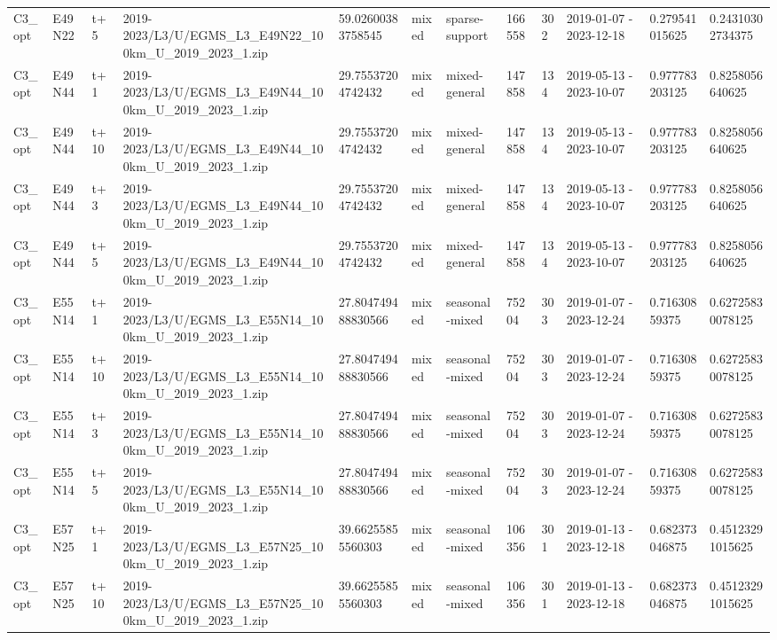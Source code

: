 \begin{landscape}
\begin{longtable}{llllllllllll}
C3\_opt & E49N22 & t+5 & 2019-2023/L3/U/EGMS\_L3\_E49N22\_100km\_U\_2019\_2023\_1.zip & 59.02600383758545 & mixed & sparse-support & 166558 & 302 & 2019-01-07 - 2023-12-18 & 0.279541015625 & 0.24310302734375 \\
C3\_opt & E49N44 & t+1 & 2019-2023/L3/U/EGMS\_L3\_E49N44\_100km\_U\_2019\_2023\_1.zip & 29.75537204742432 & mixed & mixed-general & 147858 & 134 & 2019-05-13 - 2023-10-07 & 0.977783203125 & 0.8258056640625 \\
C3\_opt & E49N44 & t+10 & 2019-2023/L3/U/EGMS\_L3\_E49N44\_100km\_U\_2019\_2023\_1.zip & 29.75537204742432 & mixed & mixed-general & 147858 & 134 & 2019-05-13 - 2023-10-07 & 0.977783203125 & 0.8258056640625 \\
C3\_opt & E49N44 & t+3 & 2019-2023/L3/U/EGMS\_L3\_E49N44\_100km\_U\_2019\_2023\_1.zip & 29.75537204742432 & mixed & mixed-general & 147858 & 134 & 2019-05-13 - 2023-10-07 & 0.977783203125 & 0.8258056640625 \\
C3\_opt & E49N44 & t+5 & 2019-2023/L3/U/EGMS\_L3\_E49N44\_100km\_U\_2019\_2023\_1.zip & 29.75537204742432 & mixed & mixed-general & 147858 & 134 & 2019-05-13 - 2023-10-07 & 0.977783203125 & 0.8258056640625 \\
C3\_opt & E55N14 & t+1 & 2019-2023/L3/U/EGMS\_L3\_E55N14\_100km\_U\_2019\_2023\_1.zip & 27.804749488830566 & mixed & seasonal-mixed & 75204 & 303 & 2019-01-07 - 2023-12-24 & 0.71630859375 & 0.62725830078125 \\
C3\_opt & E55N14 & t+10 & 2019-2023/L3/U/EGMS\_L3\_E55N14\_100km\_U\_2019\_2023\_1.zip & 27.804749488830566 & mixed & seasonal-mixed & 75204 & 303 & 2019-01-07 - 2023-12-24 & 0.71630859375 & 0.62725830078125 \\
C3\_opt & E55N14 & t+3 & 2019-2023/L3/U/EGMS\_L3\_E55N14\_100km\_U\_2019\_2023\_1.zip & 27.804749488830566 & mixed & seasonal-mixed & 75204 & 303 & 2019-01-07 - 2023-12-24 & 0.71630859375 & 0.62725830078125 \\
C3\_opt & E55N14 & t+5 & 2019-2023/L3/U/EGMS\_L3\_E55N14\_100km\_U\_2019\_2023\_1.zip & 27.804749488830566 & mixed & seasonal-mixed & 75204 & 303 & 2019-01-07 - 2023-12-24 & 0.71630859375 & 0.62725830078125 \\
C3\_opt & E57N25 & t+1 & 2019-2023/L3/U/EGMS\_L3\_E57N25\_100km\_U\_2019\_2023\_1.zip & 39.66255855560303 & mixed & seasonal-mixed & 106356 & 301 & 2019-01-13 - 2023-12-18 & 0.682373046875 & 0.45123291015625 \\
C3\_opt & E57N25 & t+10 & 2019-2023/L3/U/EGMS\_L3\_E57N25\_100km\_U\_2019\_2023\_1.zip & 39.66255855560303 & mixed & seasonal-mixed & 106356 & 301 & 2019-01-13 - 2023-12-18 & 0.682373046875 & 0.45123291015625 \\

\end{longtable}
\end{landscape}
